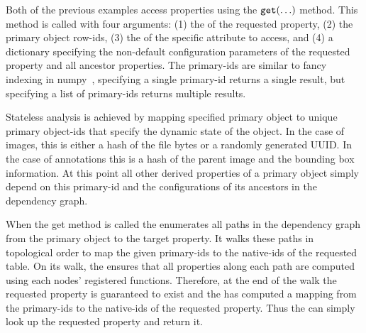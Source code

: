         Both of the previous examples access properties using the
          $\tt{get(\ldots)}$ method.
        This method is called with four arguments:
        (1) the \tablename{} of the requested property,
        (2) the primary object row-ids,
        (3) the \colname{} of the specific attribute to access, and
        (4) a dictionary specifying the non-default configuration parameters
          of the requested property and all ancestor properties.
        The primary-ids are similar to fancy indexing in
          numpy~\cite{van_der_walt_numpy_2011}, \eg{} specifying a single
          primary-id returns a single result, but specifying a list of
          primary-ids returns multiple results.

        Stateless analysis is achieved by mapping specified primary object to
          unique primary object-ids that specify the dynamic state of the
          object.
        In the case of images, this is either a hash of the file bytes or a
          randomly generated UUID{}.
        In the case of annotations this is a hash of the parent image and the
          bounding box information.
        At this point all other derived properties of a primary object simply
          depend on this primary-id and the configurations of its ancestors in
          the dependency graph.

        When the get method is called the \depcache{} enumerates all paths in
          the dependency graph from the primary object to the target property.
        It walks these paths in topological order to map the given primary-ids
          to the native-ids of the requested table.
        On its walk, the \depcache{} ensures that all properties along each
          path are computed using each nodes' registered functions.
        Therefore, at the end of the walk the requested property is guaranteed
          to exist and the \depcache{} has computed a mapping from the
          primary-ids to the native-ids of the requested property.
        Thus the \depcache{} can simply look up the requested property and
          return it.

